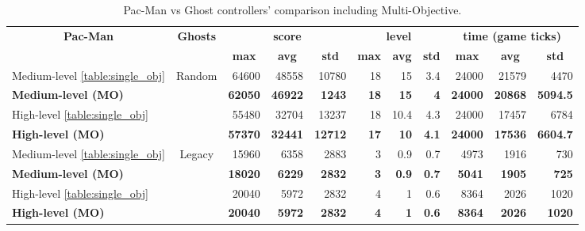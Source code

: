 \begin{table}[tb]
\centering
\label{table:multi-objective}
\begin{tabular}{|l|c|r|r|r|r|r|r|r|r|r|}
\hline
\multicolumn{1}{|c|}{\multirow{2}{*}{\textbf{Pac-Man}}} & \multirow{2}{*}{\textbf{Ghosts}} & \multicolumn{3}{c|}{\textbf{score}} & \multicolumn{3}{c|}{\textbf{level}} & \multicolumn{3}{c|}{\textbf{time (game ticks)}} \\ \cline{3-11} 
\multicolumn{1}{|c|}{} &  & \multicolumn{1}{c|}{\textbf{max}} & \multicolumn{1}{c|}{\textbf{avg}} & \multicolumn{1}{c|}{\textbf{std}} & \multicolumn{1}{c|}{\textbf{max}} & \multicolumn{1}{c|}{\textbf{avg}} & \multicolumn{1}{c|}{\textbf{std}} & \multicolumn{1}{c|}{\textbf{max}} & \multicolumn{1}{c|}{\textbf{avg}} & \multicolumn{1}{c|}{\textbf{std}} \\ \hline
Medium-level \ref{table:single_obj} & \multirow{4}{*}{Random} & {64600} & {48558} & {10780} & {18} & {15} & {3.4} & {24000} & {21579} & {4470} \\ \cline{1-1} \cline{3-11} 
\textbf{Medium-level (MO)} &  & \textbf{62050} & \textbf{46922} & \textbf{1243} & \textbf{18} & \textbf{15} & \textbf{4} & \textbf{24000} & \textbf{20868} & \textbf{5094.5} \\ \cline{1-1} \cline{3-11} 
{High-level \ref{table:single_obj}} &  & {55480} & {32704} & {13237} & {18} & {10.4} & {4.3} & {24000} & {17457} & {6784} \\ \cline{1-1} \cline{3-11} 
\textbf{High-level (MO)} &  & \textbf{57370} & \textbf{32441} & \textbf{12712} & \textbf{17} & \textbf{10} & \textbf{4.1} & \textbf{24000} & \textbf{17536} & \textbf{6604.7} \\ \hline
{Medium-level \ref{table:single_obj}} & \multirow{4}{*}{Legacy} & {15960} & {6358} & {2883} & {3} & {0.9} & {0.7} & {4973} & {1916} & {730} \\ \cline{1-1} \cline{3-11} 
\textbf{Medium-level (MO)} &  & \textbf{18020} & \textbf{6229} & \textbf{2832} & \textbf{3} & \textbf{0.9} & \textbf{0.7} & \textbf{5041} & \textbf{1905} & \textbf{725} \\ \cline{1-1} \cline{3-11} 
{High-level \ref{table:single_obj}} &  & {20040} & {5972} & {2832} & {4} & {1} & {0.6} & {8364} & {2026} & {1020} \\ \cline{1-1} \cline{3-11} 
\textbf{High-level (MO)} &  & \textbf{20040} & \textbf{5972} & \textbf{2832} & \textbf{4} & \textbf{1} & \textbf{0.6} & \textbf{8364} & \textbf{2026} & \textbf{1020} \\ \hline
\end{tabular}
\caption{Pac-Man vs Ghost controllers' comparison including Multi-Objective.}
\end{table}


